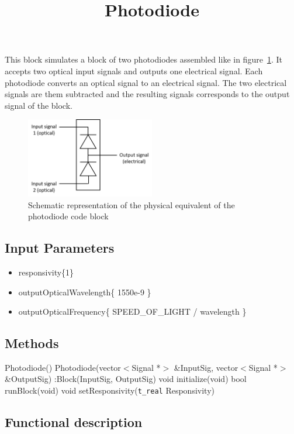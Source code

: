 \documentclass[a4paper]{article}
\title{Photodiode}
\begin{document}
\maketitle

This block simulates a block of two photodiodes assembled like in figure~\ref{photodiode}. It accepts two optical input signals and outputs one electrical signal. Each photodiode converts an optical signal to an electrical signal. The two electrical signals are them subtracted and the resulting signals corresponds to the output signal of the block.

\begin{figure}[h]
	\centering\includegraphics[width=0.5\textwidth]{photodiode.png}
	\caption{Schematic representation of the physical equivalent of the photodiode code block}\label{photodiode}
\end{figure}

\subsection*{Input Parameters}

\begin{itemize}
	\item responsivity\{1\}
	\item outputOpticalWavelength\{ 1550e-9 \}
	\item outputOpticalFrequency\{ SPEED\_OF\_LIGHT / wavelength \}
\end{itemize}

\subsection*{Methods}
 
Photodiode() {}
\bigbreak
Photodiode(vector$<$Signal *$>$ \&InputSig, vector$<$Signal *$>$ \&OutputSig) :Block(InputSig, OutputSig) {}
\bigbreak
void initialize(void)
\bigbreak
bool runBlock(void)
\bigbreak
void setResponsivity(\texttt{t\_real} Responsivity)

\subsection*{Functional description}
\end{document}

